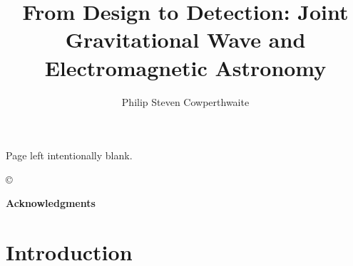 \documentclass[bound]{hvdthesis}
\author{Philip Steven Cowperthwaite}
\title{From Design to Detection: Joint Gravitational Wave and Electromagnetic Astronomy}
\begin{document}


\clearpage
\thispagestyle{empty}
\begin{center}
\vspace*{\fill}
Page left intentionally blank.
\vspace*{\fill}
\end{center}

\frontmatter

\makecover
\copyright

%
{\singlespace
\tableofcontents
}
\newpage
\clearpage


\newpage
%
\thispagestyle{plain}

\vskip 0.5cm
{\centerline {\Large \bf Acknowledgments}}
\vskip 0.5cm
\normalsize




%


\mainmatter
\pagestyle{fancy}


%
%

\chapter[Introduction]{Introduction}\label{c:ch1}

\clearpage
%
\end{document}

